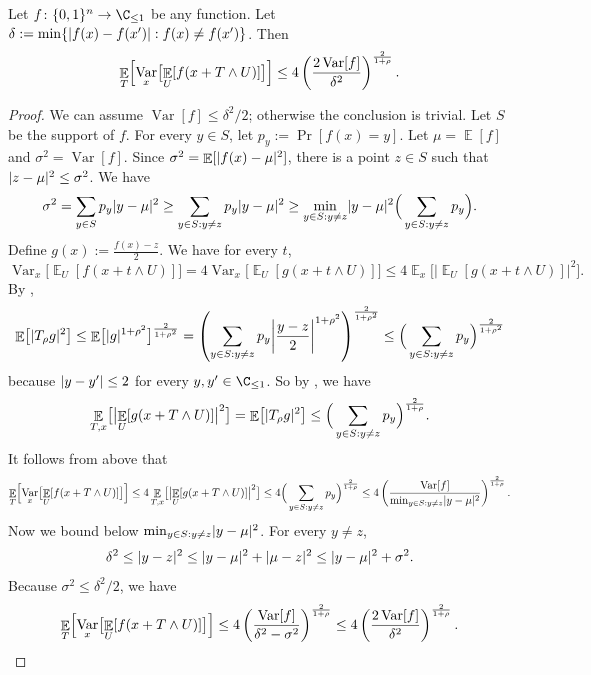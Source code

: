 \documentclass{toc}
\newcommand{\zo}{\{0,1\}}
\DeclarePairedDelimiter{\abs}{\lvert}{\rvert}
\DeclareMathOperator*{\E}{\mathbb{E}}                 %
\DeclareMathOperator*{\Var}{Var}                 %
\begin{document}
  \begin{lemma} \label{lemma:noise-reduce-var}
    Let $f \colon \zo^n \to \C_{\le 1}$ be any function.
    Let $\delta := \min\{ \abs{f(x) - f(x')}: f(x) \neq f(x') \}$. 
    Then 
    \[
      \E_T \Bigl[ \Var_x \bigl[ \E_U [f(x + T \wedge U)] \bigr] \Bigr]
      \le 4 \left( \frac{2\Var[f]}{\delta^2} \right)^{\frac{2}{1 + \rho}} .
    \]
  \end{lemma}
  \begin{proof}
    We can assume $\Var[f] \le \delta^2/2$; otherwise the conclusion is trivial.
    Let $S$ be the support of $f$.
    For every $y \in S$, let $p_y := \Pr[f(x) = y]$.
    Let $\mu = \E[f]$ and $\sigma^2 = \Var[f]$.
    Since $\sigma^2 = \E[\abs{f(x) - \mu}^2]$, there is a point $z \in S$ such that $\abs{z - \mu}^2 \le \sigma^2$.
    We have
    \[
      \sigma^2
      = \sum_{y \in S} p_y \abs{ y - \mu }^2
      \ge \sum_{y \in S: y \neq z} p_y \abs{ y - \mu }^2
      \ge \min_{y \in S: y \neq z} \abs{ y - \mu }^2 \Big( \sum_{y \in S: y \neq z} p_y \Big) .
    \]
    Define $g(x) := \frac{f(x) - z}{2}$.
    We have for every $t$,
    \[
      \Var_x \bigl[ \E_U [f (x + t \wedge U) ] \bigr]
      = 4 \Var_x \bigl[ \E_U [g (x + t \wedge U) ] \bigr]
      \le 4 \E_x \bigl[ \bigl| \E_U [g (x + t \wedge U) ] \bigr|^2 \bigr] .
    \]
    By , 
    \[
      \E \bigl[\abs{T_\rho g}^2 \bigr]
      \le \E \bigl[ \abs{g}^{1 + \rho^2} \bigr]^{\frac{2}{1 + \rho^2}}
      = \left( \sum_{ y \in S: y \neq z } p_y \abs*{ \frac{y - z}{2} }^{1 + \rho^2} \right)^{\frac{2}{1 + \rho^2}}
      \le \Big( \sum_{y \in S: y \neq z} p_y \Big)^{\frac{2}{1 + \rho^2}}
    \]
    because $\abs{y - y'} \le 2$ for every $y, y' \in \C_{\le 1}$.
    So by , we have 
    \[
      \E_{T,x} \bigl[ \bigl| \E_U [g (x + T \wedge U) ] \bigr|^2 \bigr]
      = \E \bigl[ \abs{T_\rho g}^2 \bigr]
      \le \Big( \sum_{y \in S: y \neq z} p_y \Big)^{\frac{2}{1 + \rho}} .
    \]
    It follows from above that
    \[
      \E_T \Bigl[ \Var_x \bigl[ \E_U [f(x + T \wedge U)] \bigr] \Bigr]
      \le 4 \E_{T,x} \bigl[ \bigl| \E_U [g (x + T \wedge U) ] \bigr|^2 \bigr] \\
      \le 4 \Big( \sum_{y \in S: y \neq z} p_y \Big)^{\frac{2}{1 + \rho}}  \\
      \le 4 \left( \frac{\Var[f]}{\min_{y \in S: y \neq z} \abs{y - \mu}^2} \right)^{\frac{2}{1 + \rho}} .
    \]
    Now we bound below $\min_{y \in S: y \neq z} \abs{y - \mu}^2$.
    For every $y \neq z$,
    \[
      \delta^2
      \le \abs{y - z}^2
      \le \abs{y - \mu}^2 + \abs{\mu - z}^2
      \le \abs{y - \mu}^2 + \sigma^2 .
    \]
    Because $\sigma^2 \le \delta^2/2$, we have
    \[
      \E_T \Bigl[ \Var_x \bigl[ \E_U [f(x + T \wedge U)] \bigr] \Bigr]
      \le 4 \left( \frac{\Var[f]}{ \delta^2  - \sigma^2 } \right)^{\frac{2}{1 + \rho}}
      \le 4 \left( \frac{2 \Var[f]}{ \delta^2 } \right)^{\frac{2}{1 + \rho}} . \qedhere
    \]
  \end{proof}
  
\end{document}
